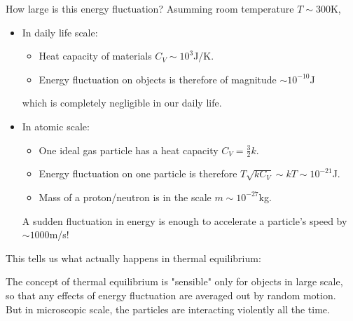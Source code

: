 \documentclass[class=article, crop=false, 12pt]{standalone}
\begin{document}

How large is this energy fluctuation?
Asumming room temperature $T\sim 300$K,
\begin{itemize}
    \item In daily life scale: 
    \begin{itemize}
        \item Heat capacity of materials $C_V\sim 10^3$J/K. 
        \item Energy fluctuation on objects is therefore of magnitude $\sim 10^{-10}$J
    \end{itemize}
    which is completely negligible in our daily life.

    \item In atomic scale:
    \begin{itemize}
        \item One ideal gas particle has a heat capacity $C_V= \frac{3}{2}k$.
        \item Energy fluctuation on one particle is therefore $T\sqrt{kC_V} \sim kT \sim 10^{-21}$J.
        \item Mass of a proton/neutron is in the scale $m\sim 10^{-27}$kg.
    \end{itemize}
    A sudden fluctuation in energy is enough to accelerate a particle's speed by $\sim 1000$m/s!
\end{itemize}
 
This tells us what actually happens in thermal equilibrium:
\begin{center}
    \begin{minipage}{0.9\textwidth}
        \begin{framed}
            \centering
            The concept of thermal equilibrium is "sensible" only for objects in large scale,\\
            so that any effects of energy fluctuation are averaged out by random motion.\\
            But in microscopic scale, the particles are interacting violently all the time.
        \end{framed}
    \end{minipage}
\end{center}

\end{document}
